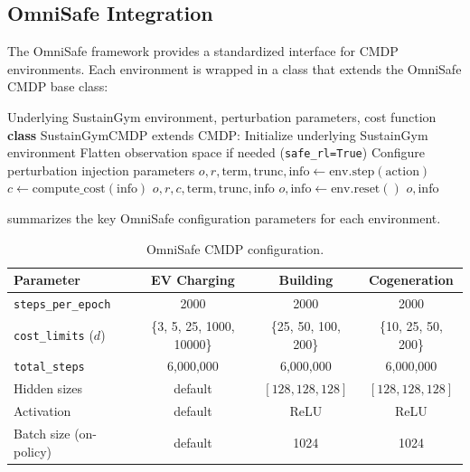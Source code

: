 \subsection{OmniSafe Integration}
\label{sec:omnisafe_integration}

The OmniSafe framework provides a standardized interface for CMDP environments. Each environment is wrapped in a class that extends the OmniSafe CMDP base class:

\begin{algorithm}[htbp]
\caption{OmniSafe CMDP Environment Wrapper}
\label{alg:omnisafe_wrapper}
\begin{algorithmic}[1]
\Require Underlying SustainGym environment, perturbation parameters, cost function
\Statex \textbf{class} SustainGymCMDP extends CMDP:
\Statex
{}
    \State Initialize underlying SustainGym environment
    \State Flatten observation space if needed (\texttt{safe\_rl=True})
    \State Configure perturbation injection parameters
\EndFunction
\Statex
{}
    \State $o, r, \text{term}, \text{trunc}, \text{info} \gets \text{env.step}(\text{action})$
    \State $c \gets \text{compute\_cost}(\text{info})$ 
    \State \Return $o, r, c, \text{term}, \text{trunc}, \text{info}$
\EndFunction
\Statex
{}
    \State $o, \text{info} \gets \text{env.reset}()$
    \State \Return $o, \text{info}$
\EndFunction
\end{algorithmic}
\end{algorithm}

 summarizes the key OmniSafe configuration parameters for each environment.

\begin{table}[htbp]
\centering
\caption{OmniSafe CMDP configuration.}
\label{tab:omnisafe_config}
\begin{tabular}{@{}lccc@{}}
\toprule
\textbf{Parameter} & \textbf{EV Charging} & \textbf{Building} & \textbf{Cogeneration} \\
\midrule
\texttt{steps\_per\_epoch} & 2000 & 2000 & 2000 \\
\texttt{cost\_limits} ($d$) & \{3, 5, 25, 1000, 10000\} & \{25, 50, 100, 200\} & \{10, 25, 50, 200\} \\
\texttt{total\_steps} & 6,000,000 & 6,000,000 & 6,000,000 \\
Hidden sizes & default & $[128, 128, 128]$ & $[128, 128, 128]$ \\
Activation & default & ReLU & ReLU \\
Batch size (on-policy) & default & 1024 & 1024 \\
\bottomrule
\end{tabular}
\end{table}

